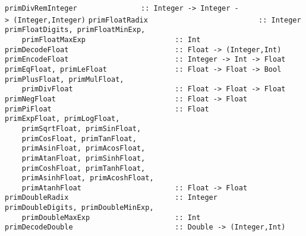 \mbox{\tt primDivRemInteger\ \ \ \ \ \ \ \ \ \ \ \ \ \ \ ::\ Integer\ ->\ Integer\ ->\ (Integer,Integer)}
\eprogB\noindent\bprogB
\mbox{\tt primFloatRadix\ \ \ \ \ \ \ \ \ \ \ \ \ \ \ \ \ \ \ \ \ \ \ \ \ \ ::\ Integer}\\
\mbox{\tt primFloatDigits,\ primFloatMinExp,}\\
\mbox{\tt \ \ \ \ primFloatMaxExp\ \ \ \ \ \ \ \ \ \ \ \ \ \ \ \ \ \ \ \ \ ::\ Int}\\
\mbox{\tt primDecodeFloat\ \ \ \ \ \ \ \ \ \ \ \ \ \ \ \ \ \ \ \ \ \ \ \ \ ::\ Float\ ->\ (Integer,Int)}\\
\mbox{\tt primEncodeFloat\ \ \ \ \ \ \ \ \ \ \ \ \ \ \ \ \ \ \ \ \ \ \ \ \ ::\ Integer\ ->\ Int\ ->\ Float}\\
\mbox{\tt primEqFloat,\ primLeFloat\ \ \ \ \ \ \ \ \ \ \ \ \ \ \ \ ::\ Float\ ->\ Float\ ->\ Bool}\\
\mbox{\tt primPlusFloat,\ primMulFloat,}\\
\mbox{\tt \ \ \ \ primDivFloat\ \ \ \ \ \ \ \ \ \ \ \ \ \ \ \ \ \ \ \ \ \ \ \ ::\ Float\ ->\ Float\ ->\ Float}\\
\mbox{\tt primNegFloat\ \ \ \ \ \ \ \ \ \ \ \ \ \ \ \ \ \ \ \ \ \ \ \ \ \ \ \ ::\ Float\ ->\ Float}
\eprogB\noindent\bprogB
\mbox{\tt primPiFloat\ \ \ \ \ \ \ \ \ \ \ \ \ \ \ \ \ \ \ \ \ \ \ \ \ \ \ \ \ ::\ Float}\\
\mbox{\tt primExpFloat,\ primLogFloat,}\\
\mbox{\tt \ \ \ \ primSqrtFloat,\ primSinFloat,}\\
\mbox{\tt \ \ \ \ primCosFloat,\ primTanFloat,}\\
\mbox{\tt \ \ \ \ primAsinFloat,\ primAcosFloat,}\\
\mbox{\tt \ \ \ \ primAtanFloat,\ primSinhFloat,}\\
\mbox{\tt \ \ \ \ primCoshFloat,\ primTanhFloat,}\\
\mbox{\tt \ \ \ \ primAsinhFloat,\ primAcoshFloat,}\\
\mbox{\tt \ \ \ \ primAtanhFloat\ \ \ \ \ \ \ \ \ \ \ \ \ \ \ \ \ \ \ \ \ \ ::\ Float\ ->\ Float}
\eprogB\noindent\bprogB
\mbox{\tt primDoubleRadix\ \ \ \ \ \ \ \ \ \ \ \ \ \ \ \ \ \ \ \ \ \ \ \ \ ::\ Integer}\\
\mbox{\tt primDoubleDigits,\ primDoubleMinExp,}\\
\mbox{\tt \ \ \ \ primDoubleMaxExp\ \ \ \ \ \ \ \ \ \ \ \ \ \ \ \ \ \ \ \ ::\ Int}\\
\mbox{\tt primDecodeDouble\ \ \ \ \ \ \ \ \ \ \ \ \ \ \ \ \ \ \ \ \ \ \ \ ::\ Double\ ->\ (Integer,Int)}\\
